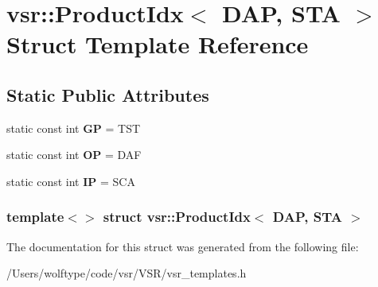\hypertarget{structvsr_1_1_product_idx_3_01_d_a_p_00_01_s_t_a_01_4}{\section{vsr\-:\-:Product\-Idx$<$ D\-A\-P, S\-T\-A $>$ Struct Template Reference}
\label{structvsr_1_1_product_idx_3_01_d_a_p_00_01_s_t_a_01_4}
}
\subsection*{Static Public Attributes}
\begin{DoxyCompactItemize}
\item 
\hypertarget{structvsr_1_1_product_idx_3_01_d_a_p_00_01_s_t_a_01_4_a76d5be0dda45600107209618eddaa83b}{static const int {\bfseries G\-P} = T\-S\-T}\label{structvsr_1_1_product_idx_3_01_d_a_p_00_01_s_t_a_01_4_a76d5be0dda45600107209618eddaa83b}

\item 
\hypertarget{structvsr_1_1_product_idx_3_01_d_a_p_00_01_s_t_a_01_4_a1cf476d6230f9735f2226187eae0fc09}{static const int {\bfseries O\-P} = D\-A\-F}\label{structvsr_1_1_product_idx_3_01_d_a_p_00_01_s_t_a_01_4_a1cf476d6230f9735f2226187eae0fc09}

\item 
\hypertarget{structvsr_1_1_product_idx_3_01_d_a_p_00_01_s_t_a_01_4_a0f0d6899d2d2bb2f816b3fd78e283817}{static const int {\bfseries I\-P} = S\-C\-A}\label{structvsr_1_1_product_idx_3_01_d_a_p_00_01_s_t_a_01_4_a0f0d6899d2d2bb2f816b3fd78e283817}

\end{DoxyCompactItemize}
\subsubsection*{template$<$$>$ struct vsr\-::\-Product\-Idx$<$ D\-A\-P, S\-T\-A $>$}



The documentation for this struct was generated from the following file\-:\begin{DoxyCompactItemize}
\item 
/\-Users/wolftype/code/vsr/\-V\-S\-R/vsr\-\_\-templates.\-h\end{DoxyCompactItemize}
